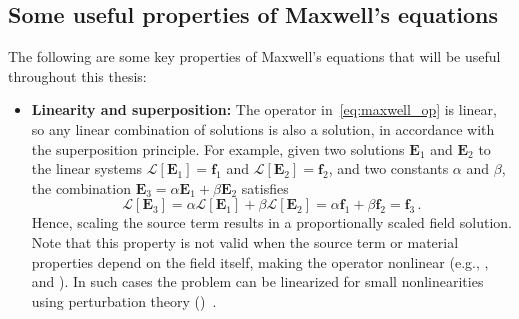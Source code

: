     \subsection*{Some useful properties of Maxwell's equations}
    The following are some key properties of Maxwell's equations that will be
    useful throughout this thesis:
    \begin{itemize}
        \item \textbf{Linearity and superposition:} The operator in~\eqref{eq:maxwell_op} is linear, so any linear combination of solutions is
              also a solution, in accordance with the superposition principle.
              For example, given two solutions $\mathbf{E}_1$ and $\mathbf{E}_2$ to the
              linear systems $\mathcal{L}[\mathbf{E}_1] = \mathbf{f}_1$ and
              $\mathcal{L}[\mathbf{E}_2] = \mathbf{f}_2$,
              and two constants $\alpha$ and $\beta$, the combination $\mathbf{E}_3 =
                  \alpha \mathbf{E}_1 + \beta \mathbf{E}_2$ satisfies
              \begin{equation}
                  \mathcal{L}[\mathbf{E}_3] = \alpha \mathcal{L}[\mathbf{E}_1] + \beta
                  \mathcal{L}[\mathbf{E}_2] = \alpha \mathbf{f}_1 + \beta \mathbf{f}_2 =
                  \mathbf{f}_3\,.
              \end{equation}
              Hence, scaling the source term results in a proportionally scaled field
              solution. Note that this property is not valid when the source term or material
              properties depend on the field itself, making the operator nonlinear (e.g., ,
               and ). In such
              cases the problem can be linearized for small nonlinearities
              using perturbation theory ()~\cite{ownpub4}.


\end{itemize}
